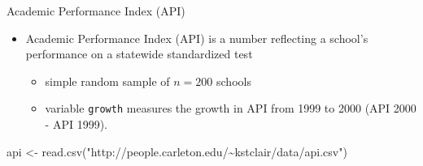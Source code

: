 \documentclass[
  10pt,
  ignorenonframetext,
]{beamer}
\newenvironment{Shaded}{\begin{snugshade}}{\end{snugshade}}
\newcommand{\AttributeTok}[1]{\textcolor[rgb]{0.77,0.63,0.00}{#1}}
\newcommand{\CommentTok}[1]{\textcolor[rgb]{0.56,0.35,0.01}{\textit{#1}}}
\newcommand{\DecValTok}[1]{\textcolor[rgb]{0.00,0.00,0.81}{#1}}
\newcommand{\ErrorTok}[1]{\textcolor[rgb]{0.64,0.00,0.00}{\textbf{#1}}}
\newcommand{\FloatTok}[1]{\textcolor[rgb]{0.00,0.00,0.81}{#1}}
\newcommand{\FunctionTok}[1]{\textcolor[rgb]{0.00,0.00,0.00}{#1}}
\newcommand{\NormalTok}[1]{#1}
\newcommand{\OtherTok}[1]{\textcolor[rgb]{0.56,0.35,0.01}{#1}}
\newcommand{\SpecialCharTok}[1]{\textcolor[rgb]{0.00,0.00,0.00}{#1}}
\newcommand{\StringTok}[1]{\textcolor[rgb]{0.31,0.60,0.02}{#1}}
\providecommand{\tightlist}{%
  \setlength{\itemsep}{0pt}\setlength{\parskip}{0pt}}
\let\oldShaded\Shaded
\let\endoldShaded\endShaded
\renewenvironment{Shaded}{\tiny\oldShaded}{\endoldShaded}
\begin{document}
\begin{frame}[fragile]{Academic Performance Index (API)}
\protect\hypertarget{academic-performance-index-api}{}
\begin{itemize}
\tightlist
\item
  Academic Performance Index (API) is a number reflecting a school's
  performance on a statewide standardized test

  \begin{itemize}
  \tightlist
  \item
    simple random sample of \(n=200\) schools
  \item
    variable \texttt{growth} measures the growth in API from 1999 to
    2000 (API 2000 - API 1999).
  \end{itemize}
\end{itemize}

\begin{Shaded}
\begin{Highlighting}[]
\NormalTok{api }\OtherTok{\textless{}{-}} \FunctionTok{read.csv}\NormalTok{(}\StringTok{"http://people.carleton.edu/\textasciitilde{}kstclair/data/api.csv"}\NormalTok{)}
\end{Highlighting}
\end{Shaded}

\begin{Shaded}
\end{Shaded}
\end{frame}
\end{document}
